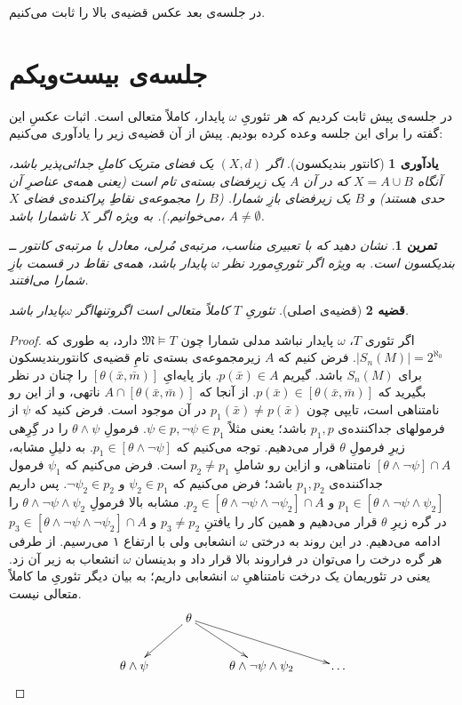 \documentclass[12pt,a4paper]{report}
\theoremstyle{colorhead}
\newtheorem{thm}{قضیه}
\newtheorem{tam}{تمرین}
\newtheorem{yad}[thm]{یادآوری}
\begin{document}
در جلسه‌ی بعد عکس قضیه‌ی بالا را  ثابت می‌کنیم.
\pagebreak
\section{جلسه‌ی بیست‌ویکم}
در جلسه‌ی پیش ثابت کردیم که هر تئوریِ
$\omega$
پایدار، کاملاً متعالی است. اثبات عکسِ این گفته را برای این جلسه وعده کرده‌ بودیم. پیش از آن قضیه‌ی زیر را یادآوری می‌کنیم:
\begin{yad}[کانتور بندیکسون]
اگر
$(X,d)$
یک فضای متریک کاملِ جدائی‌پذیر باشد، آنگاه 
$X=A\cup B$
که در آن
$A$
یک زیرفضای بسته‌ی تام است (یعنی همه‌ی عناصرِ آن حدی هستند) و 
$B$
یک زیرفضای بازِ شمارا. ($B$ را مجموعه‌ی نقاطِ پراکنده‌ی فضای
$X$
می‌خوانیم.).  به ویژه اگر
$X$
ناشمارا باشد،
$A\not=\emptyset$.
\end{yad}
\begin{tam}
نشان دهید که با تعبیری مناسب، مرتبه‌ی مُرلی، معادل با مرتبه‌ی کانتور ــ‌ بندیکسون است. به ویژه اگر تئوریِ‌مورد نظر
$\omega$
پایدار باشد، همه‌ی نقاط در قسمت بازِ شمارا می‌افتند. 
\end{tam}
\begin{thm}[قضیه‌ی اصلی]
تئوریِ
$T$
کاملاً متعالی است اگروتنهااگر
$\omega$پایدار 
باشد. 
\end{thm}
\begin{proof}
اگر تئوری $T$، 
$\omega$
پایدار نباشد مدلی شمارا چون
$\mathfrak{M}\models T$
دارد،‌ به طوری که 
\mbox{$|S_n(M)|=2^{\aleph_0}$}.
فرض کنیم که 
$A$
زیرمجموعه‌ی بسته‌ی تامِ  قضیه‌ی کانتوربندیسکون برای
$S_n(M)$
باشد. گیریم
$p(\bar{x})\in A$.
باز پایه‌ایِ
$[\theta(\bar{x}, \bar{m})]$
را چنان در نظر بگیرید که 
\mbox{$p(\bar{x})\in [\theta(\bar{x},\bar{m})]$}.
از آنجا که 
$A\cap [\theta(\bar{x},\bar{m})]$
ناتهی،‌ و از این رو
نامتناهی است، تایپی چون
$p_1(\bar{x})\not=p(\bar{x})$
در آن موجود است. 
فرض کنید که
$\psi$
از فرمولهای
جداکننده‌ی
$p_1,p$
باشد؛ یعنی مثلاً
$\psi\in p,\neg \psi\in p_1$.
فرمولِ
$\theta\wedge\psi$
را در گِرِهی زیرِ فرمولِ
$\theta$
قرار می‌دهیم. توجه می‌کنیم که
$p_1\in [\theta\wedge\neg \psi]$.
به دلیلِ مشابه،
$[\theta\wedge\neg \psi]\cap A$
نامتناهی، و ازاین رو شاملِ
$p_2\not=p_1$
است. فرض می‌کنیم که 
$\psi_1$
فرمول جداکننده‌ی
$p_1,p_2$
باشد؛ فرض می‌کنیم که 
$\psi_2\in p_1$
و
$\neg \psi_2\in p_2$.
پس داریم
$p_1\in [\theta\wedge\neg \psi\wedge\psi_2]$
و
$p_2\in [\theta\wedge\neg \psi\wedge\neg \psi_2]\cap A$.
مشابه‌ بالا فرمولِ
$\theta\wedge\neg \psi\wedge\psi_2$
را در گره زیرِ
$\theta$
قرار می‌دهیم و همین کار را یافتنِ
$p_3\not=p_2$
و 
$p_3\in [\theta\wedge\neg \psi\wedge\neg \psi_2]\cap A$
ادامه می‌دهیم. در این روند به درختی 
$\omega$
انشعابی ولی با ارتفاع ۱ می‌رسیم. از طرفی هر گره‌ درخت را می‌توان در فراروند بالا قرار داد و بدینسان
$\omega$
انشعاب به زیر آن زد. یعنی در تئوریمان یک درخت نامتناهیِ
$\omega$
انشعابی داریم؛ به بیان دیگر تئوریِ ما کاملاً متعالی نیست. 
\[
\xymatrix{
&\theta\ar[dl]\ar[dr]\ar[drr]&\\
\theta\wedge\psi&&\theta\wedge\neg\psi\wedge\psi_2& \ldots
}
\]
\end{proof}
\pagebreak 
\end{document}

